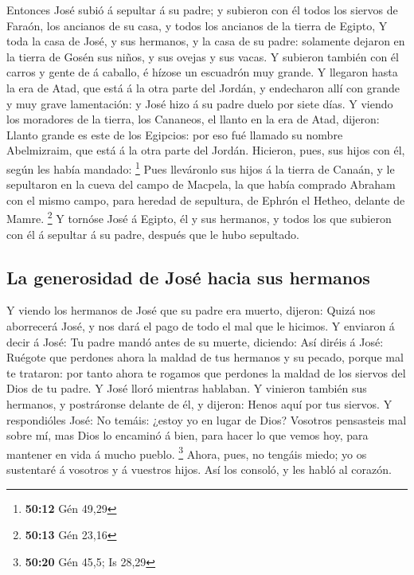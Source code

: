  Entonces José subió á sepultar á su padre; y subieron con
él todos los siervos de Faraón, los ancianos de su casa, y todos los
ancianos de la tierra de Egipto,  Y toda la casa de José, y
sus hermanos, y la casa de su padre: solamente dejaron en la tierra de
Gosén sus niños, y sus ovejas y sus vacas.  Y subieron
también con él carros y gente de á caballo, é hízose un escuadrón muy
grande.  Y llegaron hasta la era de Atad, que está á la
otra parte del Jordán, y endecharon allí con grande y muy grave
lamentación: y José hizo á su padre duelo por siete días. 
Y viendo los moradores de la tierra, los Cananeos, el llanto en la era
de Atad, dijeron: Llanto grande es este de los Egipcios: por eso fué
llamado su nombre Abelmizraim, que está á la otra parte del Jordán.
 Hicieron, pues, sus hijos con él, según les había mandado:
\footnote{\textbf{50:12} Gén 49,29}  Pues lleváronlo sus
hijos á la tierra de Canaán, y le sepultaron en la cueva del campo de
Macpela, la que había comprado Abraham con el mismo campo, para heredad
de sepultura, de Ephrón el Hetheo, delante de Mamre. \footnote{\textbf{50:13}
  Gén 23,16}  Y tornóse José á Egipto, él y sus hermanos, y
todos los que subieron con él á sepultar á su padre, después que le hubo
sepultado.

\hypertarget{la-generosidad-de-josuxe9-hacia-sus-hermanos}{%
\subsection{La generosidad de José hacia sus
hermanos}\label{la-generosidad-de-josuxe9-hacia-sus-hermanos}}

 Y viendo los hermanos de José que su padre era muerto,
dijeron: Quizá nos aborrecerá José, y nos dará el pago de todo el mal
que le hicimos.  Y enviaron á decir á José: Tu padre mandó
antes de su muerte, diciendo:  Así diréis á José: Ruégote
que perdones ahora la maldad de tus hermanos y su pecado, porque mal te
trataron: por tanto ahora te rogamos que perdones la maldad de los
siervos del Dios de tu padre. Y José lloró mientras hablaban.
 Y vinieron también sus hermanos, y postráronse delante de
él, y dijeron: Henos aquí por tus siervos.  Y respondióles
José: No temáis: ¿estoy yo en lugar de Dios?  Vosotros
pensasteis mal sobre mí, mas Dios lo encaminó á bien, para hacer lo que
vemos hoy, para mantener en vida á mucho pueblo. \footnote{\textbf{50:20}
  Gén 45,5; Is 28,29}  Ahora, pues, no tengáis miedo; yo os
sustentaré á vosotros y á vuestros hijos. Así los consoló, y les habló
al corazón.

